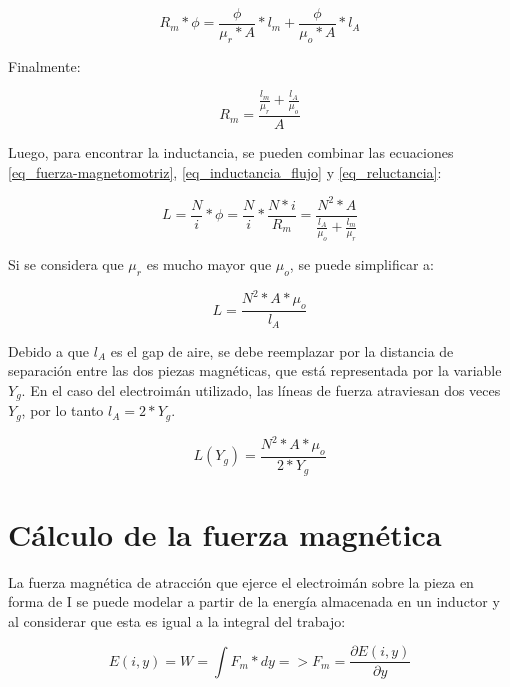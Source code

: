 \begin{equation}
		R_{m}*\phi=\frac{\phi}{\mu_{r}*A}*l_{m}+\frac{\phi}{\mu_{o}*A}*l_{A}
\end{equation}

\noindent Finalmente:

\begin{equation} \label{eq_reluctancia}
	R_{m}=\frac{\frac{l_{m}}{\mu_{r}}+\frac{l_{A}}{\mu_{o}}}{A}
\end{equation}

\noindent Luego, para encontrar la inductancia, se pueden combinar las ecuaciones  \ref{eq_fuerza-magnetomotriz}, \ref{eq_inductancia_flujo} y \ref{eq_reluctancia}:

\begin{equation}\label{eq_inductancia_2}
	L=\frac{N}{i}*\phi=\frac{N}{i}*\frac{N*i}{R_{m}}=\frac{N^{2}*A}{\frac{l_{A}}{\mu_{o}}+\frac{l_{m}}{\mu_{r}}}
\end{equation}

\noindent Si se considera que $\mu_{r}$ es mucho mayor que $\mu_{o}$, se puede simplificar a:

\begin{equation} \label{eq_inductancia_gap}
	L=\frac{N^{2}*A*\mu_{o}}{l_{A}}
\end{equation}

\noindent \noindent Debido a que $l_{A}$ es el gap de aire, se debe reemplazar por la distancia de separación entre las dos piezas magnéticas, que está representada por la variable $Y_{g}$. En el caso del electroimán utilizado, las líneas de fuerza atraviesan dos veces $Y_{g}$, por lo tanto $l_{A}=2*Y_{g}$.


\begin{equation}\label{eq_inductancia_vs_y}
		L(Y_g)=\frac{{N^{2}*A*\mu_{o}}}{2*Y_{g}}
\end{equation}

\section{Cálculo de la fuerza magnética}

\noindent La fuerza magnética de atracción que ejerce el electroimán sobre la pieza en forma de I se puede modelar a partir de la energía almacenada en un inductor y al considerar que esta es igual a la integral del trabajo:
\noindent

\begin{equation}\label{eq_energia}
	E(i,y)=W=\int{F_{m}*dy}=>F_{m}=\frac{\partial{E(i,y)}}{\partial{y}}
\end{equation}

